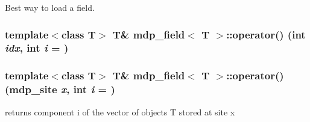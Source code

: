 Best way to load a field. \hypertarget{classmdp__field_ab99b7a328e1fa4be857fe72d180b0b35}{
\subsubsection[{operator()}]{\setlength{\rightskip}{0pt plus 5cm}template$<$class T$>$ T\& {\bf mdp\_\-field}$<$ T $>$::operator() (int {\em idx}, \/  int {\em i} = {})}}
\label{classmdp__field_ab99b7a328e1fa4be857fe72d180b0b35}
\hypertarget{classmdp__field_a9eec94ee723253a196ccc4677832b4a0}{
\subsubsection[{operator()}]{\setlength{\rightskip}{0pt plus 5cm}template$<$class T$>$ T\& {\bf mdp\_\-field}$<$ T $>$::operator() ({\bf mdp\_\-site} {\em x}, \/  int {\em i} = {})}}
\label{classmdp__field_a9eec94ee723253a196ccc4677832b4a0}


returns component i of the vector of objects T stored at site x 

